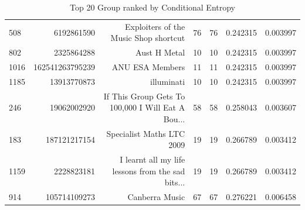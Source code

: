 \begin{table}
\begin{tabular}{| >{\small}l | >{\small}r | >{\small}r | >{\small}r | >{\small}r | >{\small}r |>{\small}r |}
508  &       6192861590 &              Exploiters of the Music Shop shortcut &    76 &       76 &             0.242315 &            0.003997 \\
802  &       2325864288 &                                       Aust H Metal &    10 &       10 &             0.242315 &            0.003997 \\
1016 &  162541263795239 &                                    ANU ESA Members &    11 &       11 &             0.242315 &            0.003997 \\
1185 &      13913770873 &                                         illuminati &    10 &       10 &             0.242315 &            0.003997 \\
246  &      19062002920 &  If This Group Gets To 100,000 I Will Eat A Bou... &    58 &       58 &             0.258043 &            0.003607 \\
183  &     187121217154 &                          Specialist Maths LTC 2009 &    19 &       19 &             0.266789 &            0.003412 \\
1159 &       2228823181 &  I learnt all my life lessons from the sad bits... &    19 &       19 &             0.266789 &            0.003412 \\
914  &     105714109273 &                                     Canberra Music &    67 &       67 &             0.276221 &            0.006458 \\
\hline
\end{tabular}
\caption{Top 20 Group ranked by Conditional Entropy}
\label {Top 20 Group ranked by Conditional Entropy}
\end{table}

